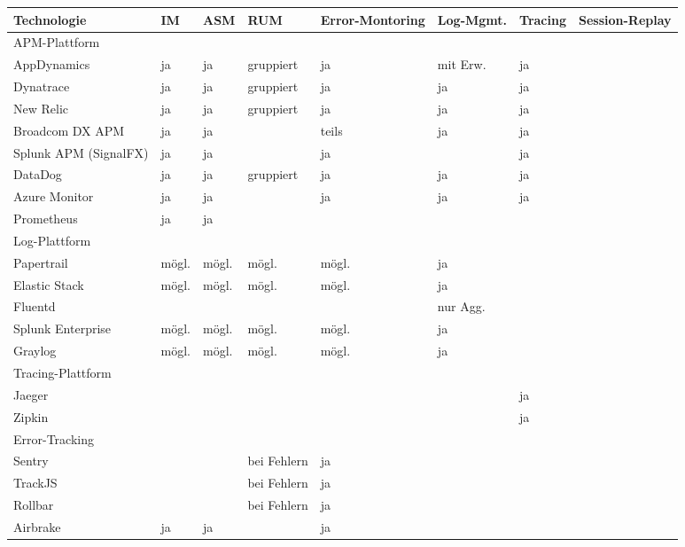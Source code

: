 \begingroup
\centering
\setlength{\LTleft}{-20cm plus -1fill}
\setlength{\LTright}{\LTleft}
\begin{longtable}{|p{4.10cm}|p{0.90cm}|p{0.90cm}|p{1.9cm}|p{1.75cm}|p{1.5cm}|p{1.4cm}|p{1.3cm}|}
\hline
Technologie & IM & ASM & RUM & Error-Montoring & Log-Mgmt. & Tracing & Session-Replay \\
\endhead
\hline
\hline
\multicolumn{8}{|l|}{APM-Plattform} \\
\hline
AppDynamics & ja & ja & gruppiert & ja & mit Erw. & ja &  \\
\hline
Dynatrace & ja & ja & gruppiert & ja & ja & ja &  \\
\hline
New Relic & ja & ja & gruppiert & ja & ja & ja &  \\
\hline
Broadcom DX APM & ja & ja &  & teils & ja & ja &  \\
\hline
Splunk APM (SignalFX) & ja & ja &  & ja &  & ja &  \\
\hline
DataDog & ja & ja & gruppiert & ja & ja & ja &  \\
\hline
Azure Monitor & ja & ja &  & ja & ja & ja &  \\
\hline
Prometheus & ja & ja &  &  &  &  &  \\
\hline
\hline
\multicolumn{8}{|l|}{Log-Plattform} \\
\hline
Papertrail & mögl. & mögl. & mögl. & mögl. & ja &  &  \\
\hline
Elastic Stack & mögl. & mögl. & mögl. & mögl. & ja &  &  \\
\hline
Fluentd &  &  &  &  & nur Agg. &  &  \\
\hline
Splunk \mbox{Enterprise} & mögl. & mögl. & mögl. & mögl. & ja &  &  \\
\hline
Graylog & mögl. & mögl. & mögl. & mögl. & ja &  &  \\
\hline
\hline
\multicolumn{8}{|l|}{Tracing-Plattform} \\
\hline
Jaeger &  &  &  &  &  & ja &  \\
\hline
Zipkin &  &  &  &  &  & ja &  \\
\hline
\hline
\multicolumn{8}{|l|}{Error-Tracking} \\
\hline
Sentry &  &  & bei \mbox{Fehlern} & ja &  &  &  \\
\hline
TrackJS &  &  & bei \mbox{Fehlern} & ja &  &  &  \\
\hline
Rollbar &  &  & bei \mbox{Fehlern} & ja &  &  &  \\
\hline
Airbrake & ja & ja &  & ja &  &  &  \\
\hline

\end{longtable}
